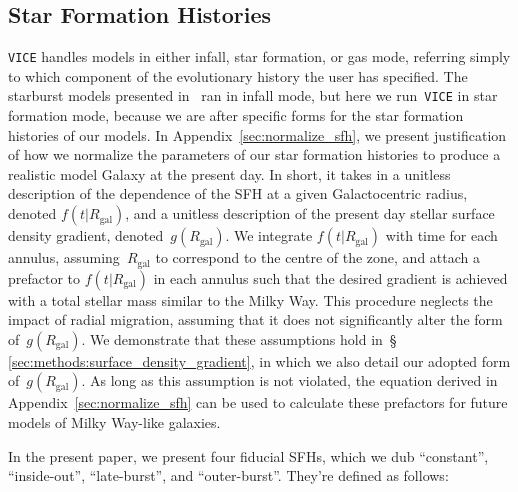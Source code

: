 \documentclass[fleqn, usenatbib]{mnras}
\begin{document}
\subsection{Star Formation Histories} 
\label{sec:methods:sfhs} 
\texttt{VICE} handles models in either infall, star formation, or gas mode, 
referring simply to which component of the evolutionary history the user has 
specified. The starburst models presented in~\citet{Johnson2020} ran in infall 
mode, but here we run~\texttt{VICE} in star formation mode, because we are 
after specific forms for the star formation histories of our models. In 
Appendix~\ref{sec:normalize_sfh}, we present justification of how we normalize 
the parameters of our star formation histories to produce a realistic model 
Galaxy at the present day. In short, it takes in a unitless description of the 
dependence of the SFH at a given Galactocentric radius, denoted 
$f(t|R_\text{gal})$, and a unitless description of the present day stellar 
surface density gradient, denoted~$g(R_\text{gal})$. We integrate 
$f(t|R_\text{gal})$ with time for each annulus, assuming~$R_\text{gal}$ to 
correspond to the centre of the zone, and attach a prefactor to 
$f(t|R_\text{gal})$ in each annulus such that the desired gradient is achieved 
with a total stellar mass similar to the Milky Way. This procedure neglects the 
impact of radial migration, assuming that it does not significantly alter the 
form of~$g(R_\text{gal})$. We demonstrate that these assumptions hold in~\S 
\ref{sec:methods:surface_density_gradient}, in which we also detail our 
adopted form of~$g(R_\text{gal})$. As long as this assumption is not violated, 
the equation derived in Appendix~\ref{sec:normalize_sfh} can be used to 
calculate these prefactors for future models of Milky Way-like galaxies. 
\par 
In the present paper, we present four fiducial SFHs, which we dub ``constant'', 
``inside-out'', ``late-burst'', and ``outer-burst''. They're defined as 
follows: 
\end{document}
